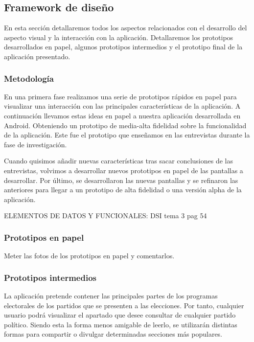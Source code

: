 \subsection{Framework de diseño} \label{ssec:prototypes}

En esta sección detallaremos todos los aspectos relacionados con el desarrollo del aspecto visual y la interacción con la aplicación. Detallaremos los prototipos desarrollados en papel, algunos prototipos intermedios y el prototipo final de la aplicación presentado.

\subsubsection{Metodología} 

En una primera fase realizamos una serie de prototipos rápidos en papel para visualizar una interacción con las principales características de la aplicación. A continuación llevamos estas ideas en papel a nuestra aplicación desarrollada en Android. Obteniendo un prototipo de media-alta fidelidad sobre la funcionalidad de la aplicación. Este fue el prototipo que enseñamos en las entrevistas durante la fase de investigación.

Cuando quisimos añadir nuevas características tras sacar conclusiones de las entrevistas, volvimos a desarrollar nuevos prototipos en papel de las pantallas a desarrollar. Por último, se desarrollaron las nuevas pantallas y se refinaron las anteriores para llegar a un prototipo de alta fidelidad o una versión alpha de la aplicación.

ELEMENTOS DE DATOS Y FUNCIONALES: DSI tema 3 pag 54

\subsubsection{Prototipos en papel}

Meter las fotos de los prototipos en papel y comentarlos.

\subsubsection{Prototipos intermedios}

La aplicación pretende contener las principales partes de los programas electorales de los partidos que se presenten a las elecciones. Por tanto, cualquier usuario podrá visualizar el apartado que desee consultar de cualquier partido político. Siendo esta la forma menos amigable de leerlo, se utilizarán distintas formas para compartir o divulgar determinadas secciones más populares.

